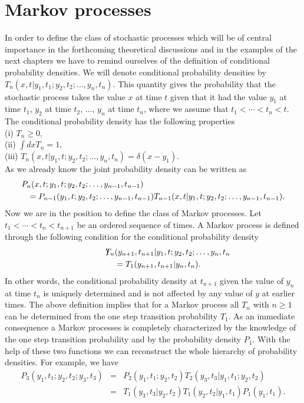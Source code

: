\section{Markov processes}
In order to define the class of stochastic processes which will be 
of central importance in the forthcoming theoretical discussions 
and in the examples of the next chapters we have to remind 
ourselves of the definition of conditional probability densities.
We will denote conditional probability densities by
$T_n(x,t|y_1,t_1;y_2,t_2; \ldots, y_n,t_n)$. This quantity gives 
the probability that the stochastic process takes the value $x$ at 
time $t$ given that it had the value $y_1$ at time $t_1$, $y_2$
at time $t_2$, $\ldots$, $y_n$ at time $t_n$, where we assume that
$t_1< \cdots <t_n < t$.  The conditional probability density has 
the following properties \\
(i) $T_n \ge 0$, \\
(ii) $\int dx T_n = 1$,  \\
(iii) $T_n(x,t|y_1,t;y_2,t_2; \ldots, y_n,t_n) = \delta(x-y_1)$.\\
As we already know the joint probability density can be written as
\begin{eqnarray*}
\lefteqn{P_n(x,t;y_1,t;y_2,t_2; \ldots, y_{n-1},t_{n-1})} \\
&& = P_{n-1}(y_1,t;y_2,t_2; \ldots, y_{n-1},t_{n-1})
T_{n-1}(x,t|y_1,t;y_2,t_2; \ldots, y_{n-1},t_{n-1}).
\end{eqnarray*}
Now we are in the position to define the class of Markov 
processes. Let $t_1< \cdots <t_n < t_{n+1}$ be an ordered sequence 
of times. A Markov process is defined through the following 
condition for the conditional probability density
\begin{eqnarray*}
\lefteqn{T_{n}(y_{n+1},t_{n+1}|y_1,t;y_2,t_2; \ldots, y_{n},t_{n}}) \\
&&= T_{1}(y_{n+1},t_{n+1}|y_{n},t_{n}).
\end{eqnarray*}
In other words, the conditional probability density at $t_{n+1}$
given the value of $y_n$ at time $t_n$ is uniquely determined and 
is not affected by any value of $y$ at earlier times.
The above definition implies that for a Markov process all
$T_n$ with $n \ge 1$ can be determined from the one step 
transition probability $T_1$. As an immediate consequence a Markov 
processes is completely characterized by the knowledge of the
one step transition probability and by the probability density
$P_1$. With the help of these two functions we can reconstruct the 
whole hierarchy of probability densities. For example, we
have
\begin{eqnarray}
\label{P3}
P_3(y_1,t_1;y_2,t_2;y_3,t_3) &=& 
      P_2(y_1,t_1;y_2,t_2) T_2(y_3,t_3|y_1,t_1;y_2,t_2)   
         \nonumber \\
    & = & T_1(y_3,t_3|y_2,t_2) T_1(y_2,t_2|y_1,t_1)
           P_1(y_1,t_1).
\end{eqnarray}

